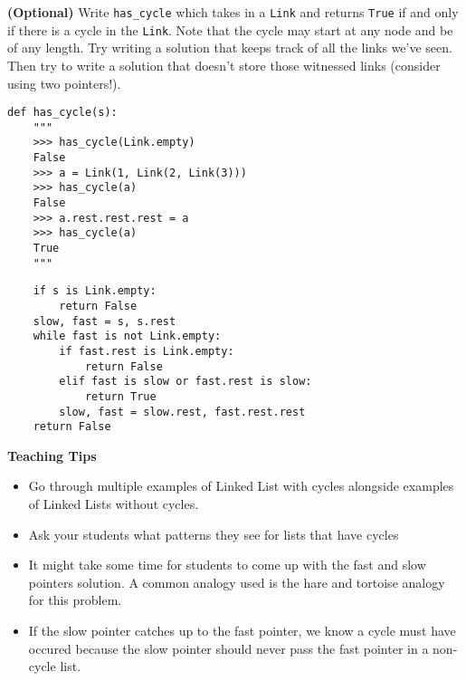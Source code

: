 \begin{blocksection}
\question \textbf{(Optional)} Write \lstinline{has_cycle} which takes in a
\lstinline{Link} and returns \lstinline{True} if and only if there is a cycle in the
\lstinline{Link}. Note that the cycle may start at any node and be of any length.
Try writing a solution that keeps track of all the links we've seen. Then try to
write a solution that doesn't store those witnessed links (consider using
two pointers!).

\begin{lstlisting}
def has_cycle(s):
    """
    >>> has_cycle(Link.empty)
    False
    >>> a = Link(1, Link(2, Link(3)))
    >>> has_cycle(a)
    False
    >>> a.rest.rest.rest = a
    >>> has_cycle(a)
    True
    """
\end{lstlisting}

\begin{solution}
\begin{lstlisting}
    if s is Link.empty:
        return False
    slow, fast = s, s.rest
    while fast is not Link.empty:
        if fast.rest is Link.empty:
            return False
        elif fast is slow or fast.rest is slow:
            return True
        slow, fast = slow.rest, fast.rest.rest
    return False
\end{lstlisting}
\end{solution}

\begin{guide}
    \textbf{Teaching Tips}
    \begin{itemize}
       \item Go through multiple examples of Linked List with cycles alongside examples of Linked Lists without cycles.
       \item Ask your students what patterns they see for lists that have cycles
       \item It might take some time for students to come up with the fast and slow pointers solution. A common analogy used is the hare and tortoise analogy for this problem.
       \item If the slow pointer catches up to the fast pointer, we know a cycle must have occured because the slow pointer should never pass the fast pointer in a non-cycle list.
    \end{itemize}
 \end{guide}

\end{blocksection}
